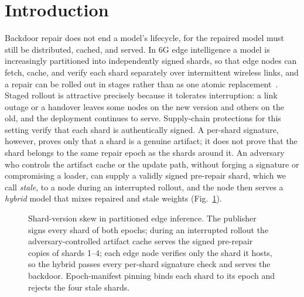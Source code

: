 \documentclass[conference,a4paper]{IEEEtran}  %
\begin{document}
\section{Introduction}
\label{sec:intro}

Backdoor repair does not end a model's lifecycle, for the repaired model must
still be distributed, cached, and served. In 6G edge intelligence a model is
increasingly partitioned into independently signed shards, so that edge nodes
can fetch, cache, and verify each shard separately over intermittent wireless
links, and a repair can be rolled out in stages rather than as one atomic
replacement~\cite{kang2017neurosurgeon,letaief2022edgeai6g}. Staged rollout is
attractive precisely because it tolerates interruption: a link outage or a
handover leaves some nodes on the new version and others on the old, and the
deployment continues to serve. Supply-chain protections for this setting verify
that each shard is authentically signed. A per-shard signature, however, proves
only that a shard is a genuine artifact; it does not prove that the shard
belongs to the same repair epoch as the shards around it. An adversary who
controls the artifact cache or the update path, without forging a signature or
compromising a loader, can supply a validly signed pre-repair shard, which we
call \emph{stale}, to a node during an interrupted rollout, and the node then
serves a \emph{hybrid} model that mixes repaired and stale weights
(Fig.~\ref{fig:overview}).

\begin{figure}[t]
\centering

\caption{Shard-version skew in partitioned edge inference. The publisher signs
every shard of both epochs; during an interrupted rollout the
adversary-controlled artifact cache serves the signed pre-repair copies of
shards 1--4; each edge node verifies only the shard it hosts, so the hybrid
passes every per-shard signature check and serves the backdoor.
Epoch-manifest pinning binds each shard to its epoch and rejects the four
stale shards.}
\label{fig:overview}
\end{figure}
\end{document}
